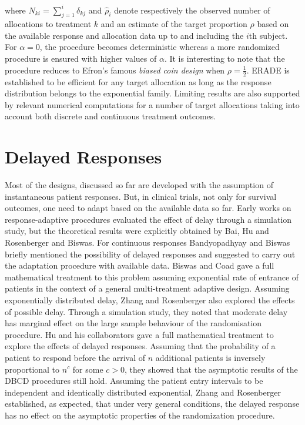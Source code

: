 where   $N_{ki}=\sum_{j=1}^{i}\delta_{kj}$ and $\hat{\rho}_{i}$  denote respectively the observed number of allocations to treatment $k$ and an  estimate of the target proportion $\rho$ based on the available response and allocation data up to and including the $i$th subject.  For $\alpha=0$, the procedure becomes deterministic whereas a more randomized procedure is ensured with higher values of $\alpha.$  It is interesting to note that the procedure reduces to Efron's famous \textit{biased coin design}\cite{72}  when $\rho=\frac{1}{2}.$ ERADE is established to be efficient for any target allocation as long as the response distribution belongs to the exponential family. Limiting results are also supported by relevant numerical computations for a number of target allocations taking into account both discrete and continuous treatment outcomes.

\section{Delayed Responses}

Most of the designs, discussed so far are developed with the
assumption of instantaneous patient responses. But, in clinical
trials, not only for survival outcomes, one need to adapt based on the available data so far. Early works\cite{28,30,73,74}  on response-adaptive
procedures evaluated the effect of delay through a simulation study, but the theoretical results were explicitly obtained by Bai, Hu and
Rosenberger\cite{75} and Biswas\cite{76}. For continuous responses
Bandyopadhyay and Biswas\cite{60} briefly mentioned the possibility
of delayed responses and suggested to carry out the adaptation
procedure with available data. Biswas and Coad\cite{61} gave a full
mathematical treatment to this problem assuming exponential rate of
entrance of patients in the context of a general multi-treatment
adaptive design. Assuming exponentially distributed delay, Zhang
and Rosenberger\cite{24} also explored the effects of possible delay.
Through a simulation study, they noted that moderate delay
has marginal effect on the large sample behaviour of the
randomisation procedure. Hu and his collaborators\cite{77} gave a
full mathematical treatment to explore the effects of delayed
responses. Assuming that the probability of a patient to respond
before the arrival of $n$ additional patients is inversely
proportional to $n^{c}$ for some $c>0$, they showed that the
asymptotic results of the DBCD procedures still hold. Assuming the
patient entry intervals to be independent and identically distributed exponential, Zhang and Rosenberger\cite{49} established, as expected, that under very general conditions, the delayed response has no effect on the asymptotic properties of the randomization procedure.

